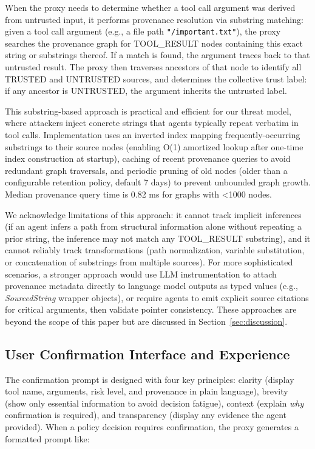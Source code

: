 When the proxy needs to determine whether a tool call argument was derived from untrusted input, it performs provenance resolution via substring matching: given a tool call argument (e.g., a file path \texttt{"/important.txt"}), the proxy searches the provenance graph for TOOL\_RESULT nodes containing this exact string or substrings thereof. If a match is found, the argument traces back to that untrusted result. The proxy then traverses ancestors of that node to identify all TRUSTED and UNTRUSTED sources, and determines the collective trust label: if any ancestor is UNTRUSTED, the argument inherits the untrusted label.

This substring-based approach is practical and efficient for our threat model, where attackers inject concrete strings that agents typically repeat verbatim in tool calls. Implementation uses an inverted index mapping frequently-occurring substrings to their source nodes (enabling O(1) amortized lookup after one-time index construction at startup), caching of recent provenance queries to avoid redundant graph traversals, and periodic pruning of old nodes (older than a configurable retention policy, default 7 days) to prevent unbounded graph growth. Median provenance query time is 0.82 ms for graphs with <1000 nodes.

We acknowledge limitations of this approach: it cannot track implicit inferences (if an agent infers a path from structural information alone without repeating a prior string, the inference may not match any TOOL\_RESULT substring), and it cannot reliably track transformations (path normalization, variable substitution, or concatenation of substrings from multiple sources). For more sophisticated scenarios, a stronger approach would use LLM instrumentation to attach provenance metadata directly to language model outputs as typed values (e.g., \textit{SourcedString} wrapper objects), or require agents to emit explicit source citations for critical arguments, then validate pointer consistency. These approaches are beyond the scope of this paper but are discussed in Section~\ref{sec:discussion}.

\subsection{User Confirmation Interface and Experience}

The confirmation prompt is designed with four key principles: clarity (display tool name, arguments, risk level, and provenance in plain language), brevity (show only essential information to avoid decision fatigue), context (explain \emph{why} confirmation is required), and transparency (display any evidence the agent provided). When a policy decision requires confirmation, the proxy generates a formatted prompt like:

